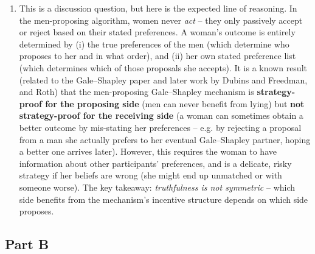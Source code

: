 \documentclass[11pt]{article}
\begin{document}
\begin{enumerate}[label=\textbf{A\arabic*.}, leftmargin=2.2em]
\item This is a discussion question, but here is the expected line of reasoning. In the
men-proposing algorithm, women never \emph{act} -- they only passively accept or reject
based on their stated preferences. A woman's outcome is entirely determined by (i) the
true preferences of the men (which determine who proposes to her and in what order), and
(ii) her own stated preference list (which determines which of those proposals she
accepts). It is a known result (related to the Gale--Shapley paper and later work by Dubins
and Freedman, and Roth) that the men-proposing Gale--Shapley mechanism is
\textbf{strategy-proof for the proposing side} (men can never benefit from lying) but
\textbf{not strategy-proof for the receiving side} (a woman can sometimes obtain a better
outcome by mis-stating her preferences -- e.g. by rejecting a proposal from a man she
actually prefers to her eventual Gale--Shapley partner, hoping a better one arrives
later). However, this requires the woman to have information about other participants'
preferences, and is a delicate, risky strategy if her beliefs are wrong (she might end up
unmatched or with someone worse). The key takeaway: \emph{truthfulness is not symmetric}
-- which side benefits from the mechanism's incentive structure depends on which side
proposes.

\end{enumerate}

\subsection*{Part B}
\end{document}
